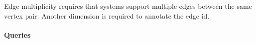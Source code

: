
Edge multiplicity requires that systems support multiple edges between the same
vertex pair. Another dimension is required to annotate the edge id.


\paragraph{Queries}
{\raggedright
}